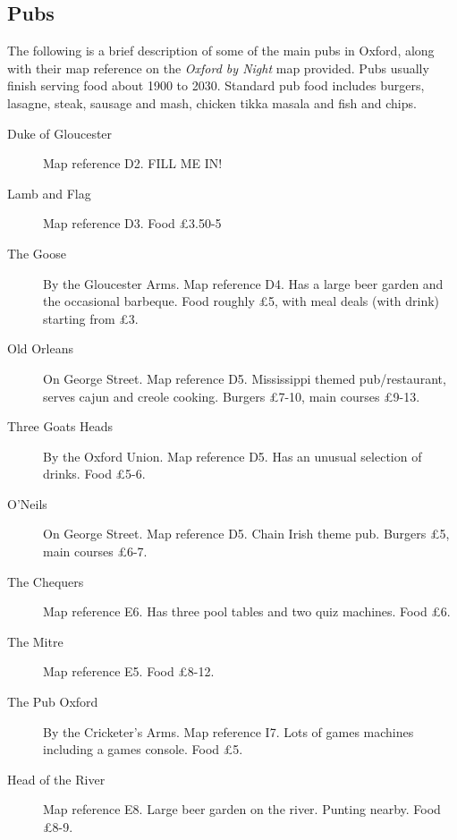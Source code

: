 
\subsection{Pubs}

The following is a brief description of some of the main pubs in Oxford, along with their map reference on the \textit{Oxford by Night} map provided.  Pubs usually finish serving food about 1900 to 2030.  Standard pub food includes burgers, lasagne, steak, sausage and mash, chicken tikka masala and fish and chips.

\begin{description}


\item[Duke of Gloucester] Map reference D2.  FILL ME IN!

\item[Lamb and Flag] Map reference D3.  Food \pounds 3.50-5

\item[The Goose] By the Gloucester Arms.  Map reference D4.  Has a large beer garden and the occasional barbeque.  Food roughly \pounds 5, with meal deals (with drink) starting from \pounds 3.

\item[Old Orleans] On George Street.  Map reference D5.  Mississippi themed pub/restaurant, serves cajun and creole cooking.  Burgers \pounds 7-10, main courses \pounds 9-13.

\item[Three Goats Heads] By the Oxford Union.  Map reference D5.  Has an unusual selection of drinks.  Food \pounds 5-6.

\item[O'Neils] On George Street.  Map reference D5.  Chain Irish theme pub.  Burgers \pounds 5, main courses \pounds 6-7.


\item[The Chequers] Map reference E6.  Has three pool tables and two quiz machines.  Food \pounds 6.

\item[The Mitre] Map reference E5.  Food \pounds 8-12.

\item[The Pub Oxford] By the Cricketer's Arms.  Map reference I7.  Lots of games machines including a games console.  Food \pounds 5.

\item[Head of the River] Map reference E8.  Large beer garden on the river.  Punting nearby.  Food \pounds 8-9.


\end{description}




